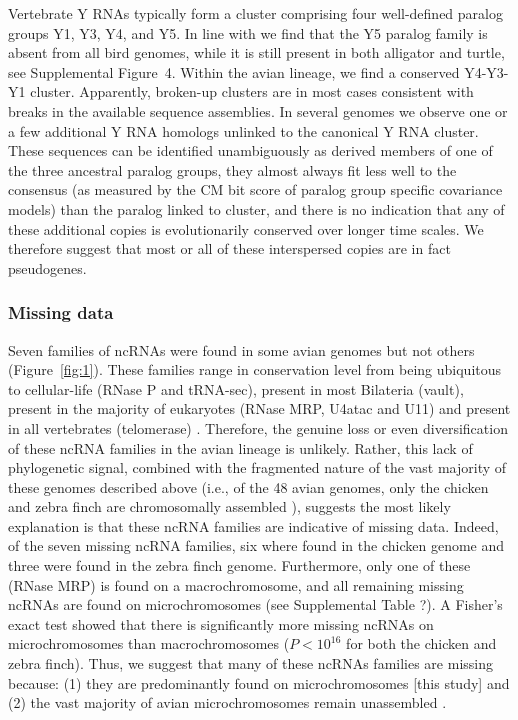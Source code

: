 \documentclass[10pt]{bmc_article}
\newenvironment{bmcformat}{\begin{raggedright}\baselineskip20pt\sloppy\setboolean{publ}{false}}{\end{raggedright}\baselineskip20pt\sloppy}
\begin{document}
\begin{bmcformat}
Vertebrate Y RNAs typically form a cluster comprising four
well-defined paralog groups Y1, Y3, Y4, and Y5. In line with
\cite{Mosig:07a} we find that the Y5 paralog family is absent from all
bird genomes, while it is still present in both alligator and turtle,
see Supplemental Figure~4. Within the avian lineage, we find a
conserved Y4-Y3-Y1 cluster. Apparently, broken-up clusters are in most
cases consistent with breaks in the available sequence assemblies.  In
several genomes we observe one or a few additional Y RNA homologs
unlinked to the canonical Y RNA cluster. These sequences can be
identified unambiguously as derived members of one of the three
ancestral paralog groups, they almost always fit less well to the
consensus (as measured by the CM bit score of paralog group specific
covariance models) than the paralog linked to cluster, and there is no
indication that any of these additional copies is evolutionarily
conserved over longer time scales. We therefore suggest that most or
all of these interspersed copies are in fact pseudogenes.

\subsubsection*{Missing data}

Seven families of ncRNAs were found in some avian genomes but not
others (Figure~\ref{fig:1}). These families range in conservation level
from being ubiquitous to cellular-life (RNase P and tRNA-sec), present
in most Bilateria (vault), present in the majority of eukaryotes
(RNase MRP, U4atac and U11) and present in all vertebrates
(telomerase) \cite{Hoeppner:2012}. Therefore, the genuine loss or even
diversification of these ncRNA families in the avian lineage is
unlikely. Rather, this lack of phylogenetic signal, combined with the
fragmented nature of the vast majority of these genomes described
above (i.e., of the 48 avian genomes, only the chicken and zebra finch
are chromosomally assembled \cite{birds:14,Warren:2010}), suggests the most likely
explanation is that these ncRNA families are indicative of missing
data. Indeed, of the seven missing ncRNA families, six where found in
the chicken genome and three were found in the zebra finch
genome. Furthermore, only one of these (RNase MRP) is found on a
macrochromosome, and all remaining missing ncRNAs are found on
microchromosomes (see Supplemental Table ?). A Fisher’s exact test
showed that there is significantly more missing ncRNAs on
microchromosomes than macrochromosomes ($P<10^{16}$ for both the
chicken and zebra finch). Thus, we suggest that many of
these ncRNAs families are missing because: (1) they are predominantly
found on microchromosomes [this study] and (2) the vast majority of
avian microchromosomes remain unassembled \cite{birds:14,Ellegren:2005}.


\end{bmcformat}
\end{document}
